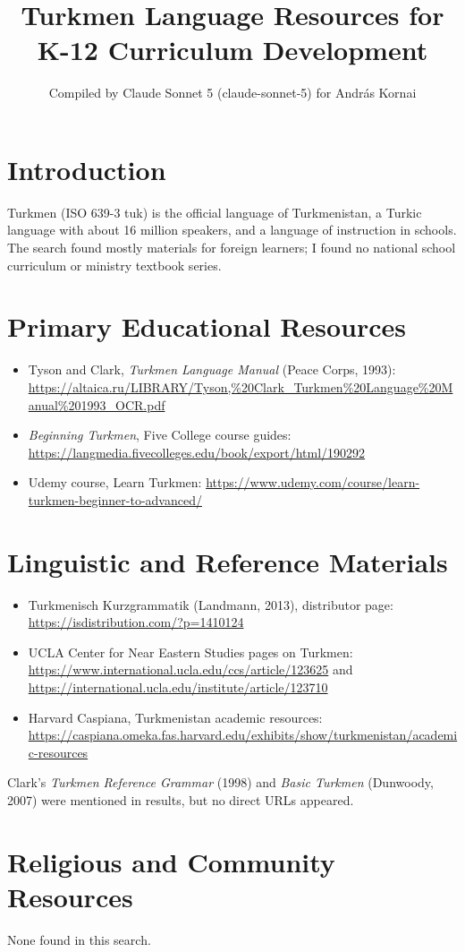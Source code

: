\documentclass[12pt]{article}
\title{Turkmen Language Resources for K-12 Curriculum Development}
\author{Compiled by Claude Sonnet 5 (claude-sonnet-5) for Andr\'as Kornai}
\date{}
\begin{document}
\maketitle
\section{Introduction}
Turkmen (ISO 639-3 tuk) is the official language of Turkmenistan, a Turkic language with about 16 million speakers, and a language of instruction in schools. The search found mostly materials for foreign learners; I found no national school curriculum or ministry textbook series.
\section{Primary Educational Resources}
\begin{itemize}
\item Tyson and Clark, \emph{Turkmen Language Manual} (Peace Corps, 1993): \url{https://altaica.ru/LIBRARY/Tyson,%20Clark_Turkmen%20Language%20Manual%201993_OCR.pdf}
\item \emph{Beginning Turkmen}, Five College course guides: \url{https://langmedia.fivecolleges.edu/book/export/html/190292}
\item Udemy course, Learn Turkmen: \url{https://www.udemy.com/course/learn-turkmen-beginner-to-advanced/}
\end{itemize}
\section{Linguistic and Reference Materials}
\begin{itemize}
\item Turkmenisch Kurzgrammatik (Landmann, 2013), distributor page: \url{https://isdistribution.com/?p=1410124}
\item UCLA Center for Near Eastern Studies pages on Turkmen: \url{https://www.international.ucla.edu/ccs/article/123625} and \url{https://international.ucla.edu/institute/article/123710}
\item Harvard Caspiana, Turkmenistan academic resources: \url{https://caspiana.omeka.fas.harvard.edu/exhibits/show/turkmenistan/academic-resources}
\end{itemize}
Clark's \emph{Turkmen Reference Grammar} (1998) and \emph{Basic Turkmen} (Dunwoody, 2007) were mentioned in results, but no direct URLs appeared.
\section{Religious and Community Resources}
None found in this search.
\end{document}
